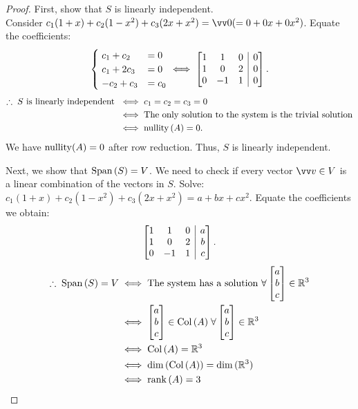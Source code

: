 \begin{proof}
    First, show that $S$ is linearly independent. \\
    Consider $c_1(1+x) + c_2(1-x^2) + c_3(2x+x^2) = \vzero (= 0 + 0x + 0x^2)$. Equate the coefficients:
    \[\begin{cases}
        \; c_1 + c_2  & = 0 \\ 
        \; c_1 + 2c_3  & = 0 \\
        \; -c_2 + c_3  &= c_0
      \end{cases}
      \iff
      \left[
        \begin{array}{@{}ccc|c@{}}
            1 & 1 & 0 & 0\\
            1 & 0 & 2 & 0 \\
            0 & -1 & 1 & 0
        \end{array}
      \right].
    \]
    \vspace{-8mm}
    \begin{align*}
        \therefore \; S \text{ is linearly independent } &\iff c_1=c_2=c_3=0 \\
        &\iff \text{The only solution to the system is the trivial solution} \\
        &\iff \operatorname{nullity}{(A)} = 0.
    \end{align*}
    We have $\operatorname{nullity}(A) = 0$ after row reduction. Thus, $S$ is linearly independent.

    Next, we show that $\operatorname{Span}{(S)} = V$. We need to check if every vector $\vvv \in V$ is a linear combination of the vectors in $S$.
    Solve: $c_1(1+x) + c_2(1-x^2) + c_3(2x+x^2) = a+bx+cx^2$. Equate the coefficients we obtain:
    \vspace{-3mm}
    \[
        \left[
            \begin{array}{@{}ccc|c@{}}
                1 & 1 & 0 & a\\
                1 & 0 & 2 & b \\
                0 & -1 & 1 & c
            \end{array}
        \right].
    \]
    \vspace{-8mm}
    \begin{align*}
        \therefore \; \operatorname{Span}{(S)} = V &\iff \text{The system has a solution } \forall \begin{bmatrix} a \\ b \\ c \end{bmatrix} \in {\mathbb{R}}^3 \\
        &\iff  \begin{bmatrix} a \\ b \\ c \end{bmatrix} \in \operatorname{Col}{(A)} \; \forall  \begin{bmatrix} a \\ b \\ c \end{bmatrix} \in {\mathbb{R}}^3 \\
        &\iff \operatorname{Col}{(A)} = {\mathbb{R}}^3 \\
        &\iff \dim{(\operatorname{Col}{(A)})} = \dim{({\mathbb{R}}^3)} \\
        &\iff \operatorname{rank}{(A)} = 3
    \end{align*}


\end{proof}
